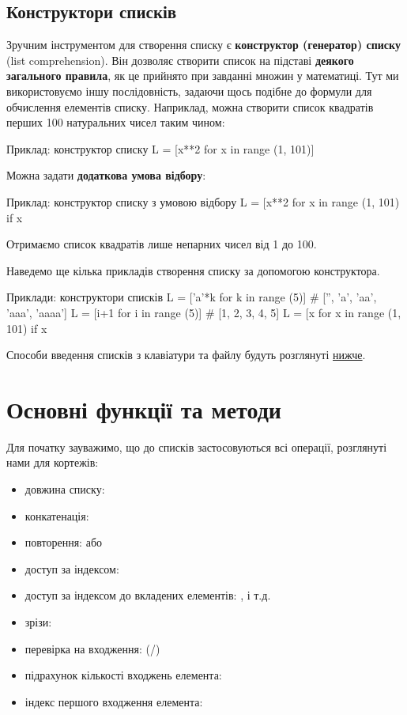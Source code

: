 \subsection{Конструктори списків} \label{lstcomp}

Зручним інструментом для створення списку є \textbf{конструктор (генератор) списку} (list comprehension). Він дозволяє створити список на підставі \textbf{деякого загального правила}, як це прийнято при завданні множин у математиці. Тут ми використовуємо іншу послідовність, задаючи щось подібне до формули для обчислення елементів списку. Наприклад, можна створити список квадратів перших 100 натуральних чисел таким чином:
\begin{py}{Приклад: конструктор списку}
L = [x**2 for x in range (1, 101)]
\end{py}
\noindent Можна задати \textbf{додаткова умова відбору}:
\begin{py}{Приклад: конструктор списку з умовою відбору}
L = [x**2 for x in range (1, 101) if x %
\end{py}
\noindent Отримаємо список квадратів лише непарних чисел від 1 до 100.

\medskip

Наведемо ще кілька прикладів створення списку за допомогою конструктора.
\begin{py}{Приклади: конструктори списків}
L = ['a'*k for k in range (5)] # ['', 'a', 'aa', 'aaa', 'aaaa']
L = [i+1 for i in range (5)] # [1, 2, 3, 4, 5]
L = [x for x in range (1, 101) if x%
\end{py}

Способи введення списків з клавіатури та файлу будуть розглянуті \hyperref [listinput]{нижче}.

\section{Основні функції та методи}

Для початку зауважимо, що до списків застосовуються всі операції, розглянуті нами для кортежів:
\begin{itemize}
\item довжина списку: 
\item конкатенація: 
\item повторення:  або 
\item доступ за індексом: 
\item доступ за індексом до вкладених елементів: ,  і т.д.
\item зрізи: 
\item перевірка на входження:  (/)
\item підрахунок кількості входжень елемента: 
\item індекс першого входження елемента: 
\end{itemize}

